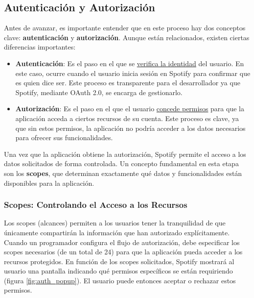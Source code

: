 \subsection{Autenticación y Autorización}

Antes de avanzar, es importante entender que en este proceso hay dos conceptos clave: \textbf{autenticación} y \textbf{autorización}. Aunque están relacionados, existen ciertas diferencias importantes:

\begin{itemize}
    \item \textbf{Autenticación}: Es el paso en el que se \underline{verifica la identidad} del usuario. En este caso, ocurre cuando el usuario inicia sesión en Spotify para confirmar que es quien dice ser. Este proceso es transparente para el desarrollador ya que Spotify, mediante OAuth 2.0, se encarga de gestionarlo.
    \item \textbf{Autorización}: Es el paso en el que el usuario \underline{concede permisos} para que la aplicación acceda a ciertos recursos de su cuenta. Este proceso es clave, ya que sin estos permisos, la aplicación no podría acceder a los datos necesarios para ofrecer sus funcionalidades.
\end{itemize}

Una vez que la aplicación obtiene la autorización, Spotify permite el acceso a los datos solicitados de forma controlada. Un concepto fundamental en esta etapa son los \textbf{scopes}, que determinan exactamente qué datos y funcionalidades están disponibles para la aplicación.

\subsubsection*{Scopes: Controlando el Acceso a los Recursos} \label{subsubsec:scopes}

Los scopes (alcances) permiten a los usuarios tener la tranquilidad de que únicamente compartirán la información que han autorizado explícitamente. Cuando un programador configura el flujo de autorización, debe especificar los scopes necesarios (de un total de 24) para que la aplicación pueda acceder a los recursos protegidos. En función de los scopes solicitados, Spotify mostrará al usuario una pantalla indicando qué permisos específicos se están requiriendo (figura \ref{fig:auth_popup}). El usuario puede entonces aceptar o rechazar estos permisos.

